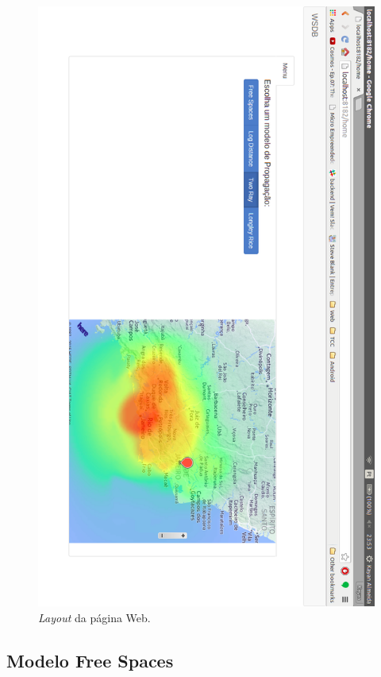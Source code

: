 \begin{figure}[H]
\centering
\includegraphics[width=1\textwidth]{figs/paginaweb}
\caption[\textit{Layout} da página Web.]
{\textit{Layout} da página Web.}
\label{fig:paginaweb}
\end{figure}

\FloatBarrier

\subsection{Modelo Free Spaces}

